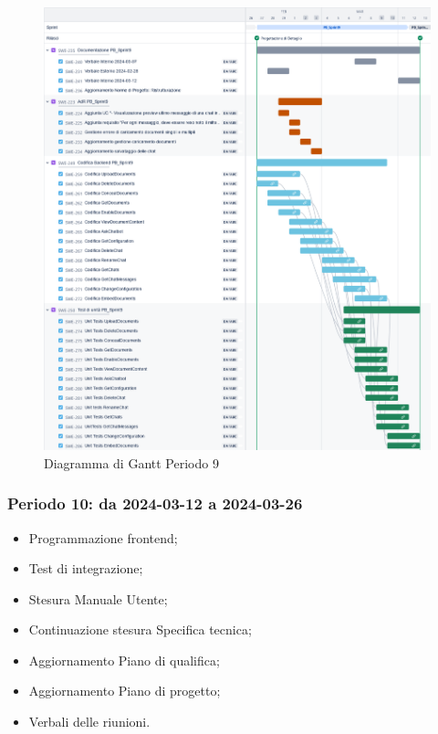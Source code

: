 \documentclass[10pt, a4paper]{article}
\begin{document}
\begin{figure}[H]
    \centering        
    \includegraphics[width=15.5cm]{gantt/ganttPeriodo9.png}
    \caption{Diagramma di Gantt Periodo 9}
\end{figure}

\subsubsection{Periodo 10: da 2024-03-12 a 2024-03-26}
%
\begin{itemize}
    \item Programmazione frontend;
    \item Test di integrazione;
    \item Stesura Manuale Utente;
    \item Continuazione stesura Specifica tecnica;
    \item Aggiornamento Piano di qualifica;
    \item Aggiornamento Piano di progetto;
    \item Verbali delle riunioni.
\end{itemize}
\end{document}
